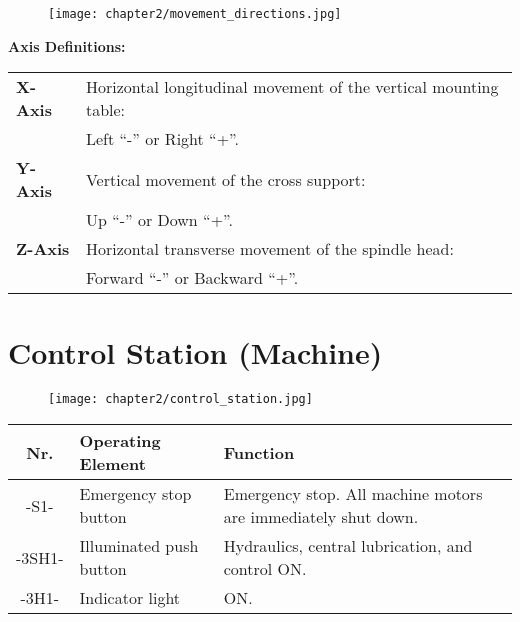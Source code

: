 \begin{figure}[h]
    \centering
    \texttt{[image: chapter2/movement\_directions.jpg]}
\end{figure}

\vspace{0.5cm}

\noindent \textbf{Axis Definitions:}

\vspace{0.3cm}

\noindent \begin{tabular}{ l l }
\textbf{X-Axis} & Horizontal longitudinal movement of the vertical mounting table: \\
                & Left \enquote{-} or Right \enquote{+}. \\
\textbf{Y-Axis} & Vertical movement of the cross support: \\
                & Up \enquote{-} or Down \enquote{+}. \\
\textbf{Z-Axis} & Horizontal transverse movement of the spindle head: \\
                & Forward \enquote{-} or Backward \enquote{+}. \\
\end{tabular}

\section{Control Station (Machine)}

\begin{figure}[h]
    \centering
    \texttt{[image: chapter2/control\_station.jpg]} %
\end{figure}


\vspace{0.3cm}

\noindent %
\begin{tabular}{|c|l|p{10cm}|}
    \hline\hline
    \textbf{Nr.} & \textbf{Operating Element} & \textbf{Function} \\
    \hline\hline
    -S1-   & Emergency stop button & Emergency stop. All machine motors are immediately shut down.\footnotemark[11] \\
    \hline
    -3SH1- & Illuminated push button & Hydraulics, central lubrication, and control ON. \\
    -3H1-  & Indicator light & ON. \\
    \hline\hline
\end{tabular}

